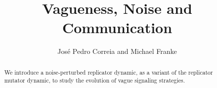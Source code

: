 \documentclass[fleqn,reqno,10pt]{article}
\title{Vagueness, Noise and Communication}
\author{Jos\'e Pedro Correia and Michael Franke}
\date{}
\begin{document}
\maketitle

\begin{abstract}
  We introduce a noise-perturbed replicator dynamic, as a variant of
  the replicator mutator dynamic, to study the evolution of vague
  signaling strategies.
\end{abstract}














\printbibliography[heading=bibintoc]
\end{document}
